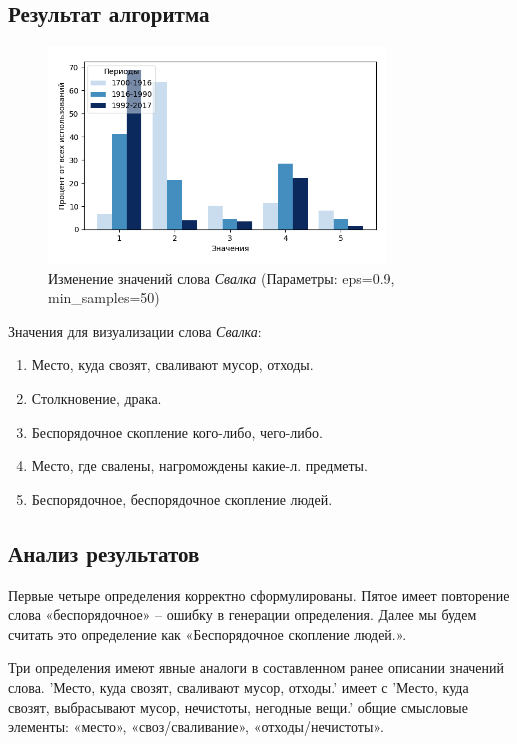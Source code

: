 \documentclass[LI,VKR]{HSEUniversity}
\begin{document}
\subsection*{Результат алгоритма}

\begin{figure}[H]
	\centering
	\includegraphics[width=0.8\textwidth]{img/Words_Meanings/Свалка (Больше значений)}
	\caption{Изменение значений слова \textit{Свалка} (Параметры: eps=0.9, min\_samples=50)}
	\label{fig:Свалка}
\end{figure}

Значения для визуализации слова \textit{Свалка}:

\begin{enumerate}
    \item Место, куда свозят, сваливают мусор, отходы.
    \item Столкновение, драка.
    \item Беспорядочное скопление кого-либо, чего-либо.
    \item Место, где свалены, нагромождены какие-л. предметы.
    \item Беспорядочное, беспорядочное скопление людей.
\end{enumerate}

\subsection*{Анализ результатов}

Первые четыре определения корректно сформулированы.
Пятое имеет повторение слова «беспорядочное» – ошибку в генерации определения.
Далее мы будем считать это определение как «Беспорядочное скопление людей.».

Три определения имеют явные аналоги в составленном ранее описании значений слова.
’Место, куда свозят, сваливают мусор, отходы.’ имеет с
’Место, куда свозят, выбрасывают мусор, нечистоты, негодные вещи.’
общие смысловые элементы:
«место», «своз/сваливание», «отходы/нечистоты».
\end{document}

